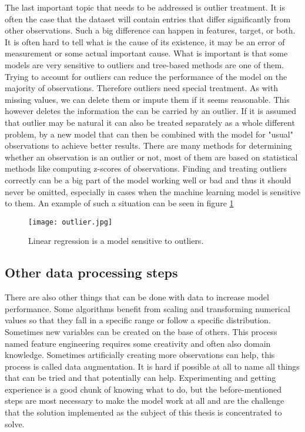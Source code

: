 \documentclass[a4paper,twoside,12pt]{book}
\newcommand*\setcaptioncitation[1]{\def\captioncitation{\textit{Source:}~#1}}
\let\captioncitation\relax
\begin{document}
The last important topic that needs to be addressed is outlier treatment. It is often the case that the dataset will contain entries that differ significantly from other observations. Such a big difference can happen in features, target, or both. It is often hard to tell what is the cause of its existence, it may be an error of measurement or some actual important cause. What is important is that some models are very sensitive to outliers and tree-based methods are one of them. Trying to account for outliers can reduce the performance of the model on the majority of observations. Therefore outliers need special treatment.
As with missing values, we can delete them or impute them if it seems reasonable. This however deletes the information the can be carried by an outlier. If it is assumed that outlier may be natural it can also be treated separately as a whole different problem, by a new model that can then be combined with the model for "usual" observations to achieve better results.
There are many methods for determining whether an observation is an outlier or not, most of them are based on statistical methods like computing z-scores of observations. 
Finding and treating outliers correctly can be a big part of the model working well or bad and thus it should never be omitted, especially in cases when the machine learning model is sensitive to them. An example of such a situation can be seen in figure \ref{fig:outlier}

\begin{figure}[!htb]
    \centering
    \texttt{[image: outlier.jpg]}
    \setcaptioncitation{\url{https://cutt.ly/njfIUKa}}
    \caption{Linear regression is a model sensitive to outliers.}
    \label{fig:outlier}
\end{figure}





\subsection{Other data processing steps}

There are also other things that can be done with data to increase model performance. Some algorithms benefit from scaling and transforming numerical values so that they fall in a specific range or follow a specific distribution. Sometimes new variables can be created on the base of others. This process named feature engineering requires some creativity and often also domain knowledge. Sometimes artificially creating more observations can help, this process is called data augmentation. It is hard if possible at all to name all things that can be tried and that potentially can help. Experimenting and getting experience is a good chunk of knowing what to do, but the before-mentioned steps are most necessary to make the model work at all and are the challenge that the solution implemented as the subject of this thesis is concentrated to solve.
\end{document}
